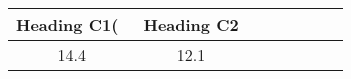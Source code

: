 \begin{tabular}{cccccccc}
{Heading C1(}\ & {Heading C2} \\ \midrule
{14.4} & {12.1} \\
\end{tabular}